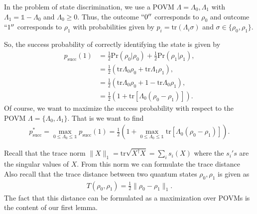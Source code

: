 \documentclass[notoc]{tufte-book}
\begin{document}
In the problem of state discrimination, we use a POVM  $\Lambda = {\Lambda_0,\Lambda_1}$ with $\Lambda_1 = \mathbb{1}-\Lambda_0$ and $\Lambda_0 \geq 0$. Thus, the outcome $``0''$ corresponds to $\rho_0$ and outcome $``1''$ corresponds to $\rho_1$ with probabilities given by $p_i = \text{tr}(\Lambda_i \sigma)$ and $\sigma \in \{\rho_0,\rho_1\}$.

So, the success probability of correctly identifying the state is given by
\begin{align}
    p_{\text{succ}} (1) &= \frac{1}{2} \text{Pr}(\rho_0 | \rho_0) + \frac{1}{2} \text{Pr}(\rho_1 | \rho_1), \\
    &= \frac{1}{2}(\text{tr}\Lambda_0 \rho_0 + \text{tr} \Lambda_1 \rho_1), \\
    &= \frac{1}{2}(\text{tr}\Lambda_0 \rho_0 + 1 - \text{tr} \Lambda_0 \rho_1), \\
    &= \frac{1}{2} \left(1 + \text{tr}\left[ \Lambda_0 (\rho_0 - \rho_1)\right]\right).
\end{align}
Of course, we want to maximize the success probability with respect to the POVM $\Lambda = \{\Lambda_0, \Lambda_1\}$. That is we want to find
\begin{align}
    p^*_{\text{succ}} = \max_{0\leq \Lambda_0 \leq \mathbb{1}} p_{\text{succ}}(1) = \frac{1}{2} \left(1+\max_{0\leq \Lambda_0 \leq \mathbb{1}} \text{tr}\left[ \Lambda_0(\rho_0-\rho_1)\right] \right).
\end{align}

Recall that the trace norm  $\| X\|_1 = \text{tr}\sqrt{X^{\dagger}X} = \sum_i s_i (X) $ where the $s_i's$ are the singular values of $X$. From this norm we can formulate the trace distance Also recall that the trace distance  between two quantum states $\rho_0,\rho_1$ is given as
\begin{align}
    T(\rho_0,\rho_1) = \frac{1}{2}\|\rho_0 - \rho_1\|_1.
\end{align}
The fact that this distance can be formulated as a maximization over POVMs is the content of our first lemma.
\end{document}

